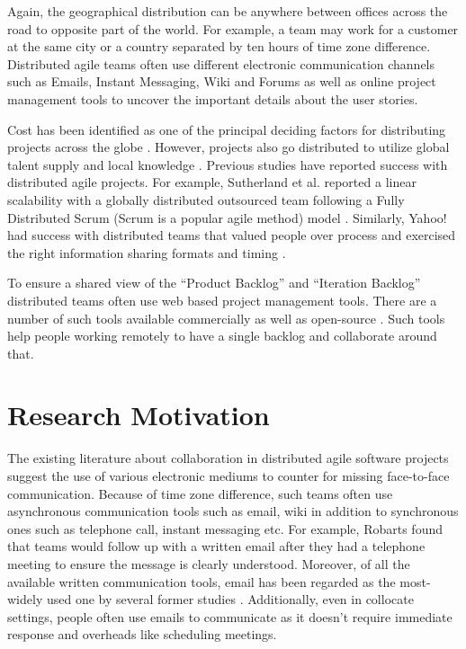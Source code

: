 Again, the geographical distribution can be anywhere between offices across the road to opposite part of the world. For example, a team may work for a customer at the same city or a country separated by ten hours of time zone difference. Distributed agile teams often use different electronic communication channels such as Emails, Instant Messaging, Wiki and Forums as well as online project management tools to uncover the important details about the user stories.

Cost has been identified as one of the principal deciding factors for distributing projects across the globe \cite{practical_considerations}. However, projects also go distributed to utilize global talent supply and local knowledge \cite{required}. Previous studies have reported success with distributed agile projects. For example, Sutherland et al. reported a linear scalability with a globally distributed outsourced team following a Fully Distributed Scrum (Scrum is a popular agile method) model \cite{fully_distributed}. Similarly, Yahoo! had success with distributed teams that valued people over process and exercised the right information sharing formats and timing \cite{yahoo}.

To ensure a shared view of the ``Product Backlog'' and ``Iteration Backlog'' distributed teams often use web based project management tools. There are a number of such tools available commercially as well as open-source \cite{required}. Such tools help people working remotely to have a single backlog and collaborate around that. 

\section{Research Motivation}
The existing literature about collaboration in distributed agile software projects suggest the use of various electronic mediums to counter for missing face-to-face communication. Because of time zone difference, such teams often use asynchronous communication tools such as email, wiki in addition to synchronous ones such as telephone call, instant messaging etc. For example, Robarts \cite{practical_considerations} found that teams would follow up with a written email after they had a telephone meeting to ensure the message is clearly understood. Moreover, of all the available written communication tools, email has been regarded as the most-widely used one by several former studies \cite{collab_in_distributed} \cite{on_coord}. Additionally, even in collocate settings, people often use emails to communicate as it doesn't require immediate response and overheads like scheduling meetings.

